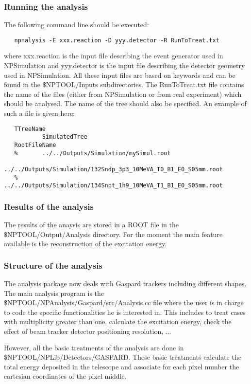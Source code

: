 \documentclass[a4paper,12pt]{article}
\begin{document}
\subsubsection{Running the analysis}
The following command line should be executed:

\begin{verbatim}
   npnalysis -E xxx.reaction -D yyy.detector -R RunToTreat.txt
\end{verbatim}

where xxx.reaction is the input file describing the event generator used in 
NPSimulation and yyy.detector is the input file describing the detector geometry
used in NPSimulation. All these input files are based on keywords and can be found 
in the \$NPTOOL/Inputs subdirectories. The RunToTreat.txt file contains the
name of the files (either from NPSimulation or from real experiment) which should
be analysed. The name of the tree should also be specified. An example 
of such a file is given here:

\begin{verbatim}
   TTreeName
           SimulatedTree
   RootFileName
   %       ../../Outputs/Simulation/mySimul.root
           ../../Outputs/Simulation/132Sndp_3p3_10MeVA_T0_B1_E0_S05mm.root
   %       ../../Outputs/Simulation/134Snpt_1h9_10MeVA_T1_B1_E0_S05mm.root
\end{verbatim}


\subsubsection{Results of the analysis}
The results of the anaysis are stored in a ROOT file in the \$NPTOOL/Output/Analysis
directory. For the moment the main feature available is the reconstruction of the 
excitation energy.


\subsubsection{Structure of the analysis}
The analysis package now deals with Gaspard trackers including different shapes.
The main analysis program is the \$NPTOOL/NPAnalysis/Gaspard/src/Analysis.cc
file where the user is in charge to code the specific functionalities he is
interested in. This includes to treat cases with multiplicity greater than one,
calculate the excitation energy, check the effect of beam tracker detector
positioning resolution, ...

However, all the basic treatments of the analysis are done in \$NPTOOL/NPLib/Detectors/GASPARD.
These basic treatments calculate the total energy deposited in the telescope and
associate for each pixel number the cartesian coordinates of the pixel middle.
\end{document}
